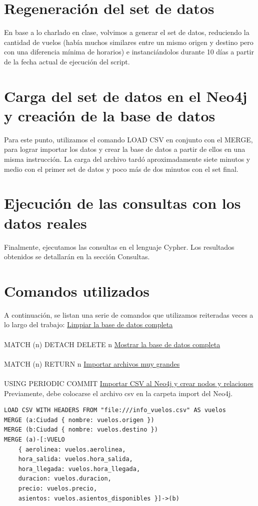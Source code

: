 \documentclass[a4paper,11pt]{article}
\begin{document}
\newpage
\section{Regeneración del set de datos}
En base a lo charlado en clase, volvimos a generar el set de datos, reduciendo la cantidad de vuelos (había muchos similares entre un mismo origen y destino pero con una diferencia mínima de horarios) e instanciándolos durante 10 días a partir de la fecha actual de ejecución del script.

\section{Carga del set de datos en el Neo4j y creación de la base de datos}
Para este punto, utilizamos el comando LOAD CSV en conjunto con el MERGE, para lograr importar los datos y crear la base de datos a partir de ellos en una misma instrucción.
La carga del archivo tardó aproximadamente siete minutos y medio con el primer set de datos y poco más de dos minutos con el set final.

\section{Ejecución de las consultas con los datos reales}
Finalmente, ejecutamos las consultas en el lenguaje Cypher. Los resultados obtenidos se detallarán en la sección Consultas.

\newpage
\section*{Comandos utilizados}
A continuación, se listan una serie de comandos que utilizamos reiteradas veces a lo largo del trabajo:
\bigbreak
\noindent
\underline{Limpiar la base de datos completa}\\
\noindent
\\
MATCH (n) DETACH DELETE n
\bigbreak
\noindent
\underline{Mostrar la base de datos completa}\\
\noindent
\\
MATCH (n) RETURN n
\bigbreak
\noindent
\underline{Importar archivos muy grandes}\\
\noindent
\\
USING PERIODIC COMMIT
\bigbreak
\noindent
\underline{Importar CSV al Neo4j y crear nodos y relaciones}\\

Previamente, debe colocarse el archivo csv en la carpeta import del Neo4j.
\begin{lstlisting}[style=neo4j]
LOAD CSV WITH HEADERS FROM "file:///info_vuelos.csv" AS vuelos
MERGE (a:Ciudad { nombre: vuelos.origen })
MERGE (b:Ciudad { nombre: vuelos.destino })
MERGE (a)-[:VUELO
	{ aerolinea: vuelos.aerolinea,
	hora_salida: vuelos.hora_salida,
	hora_llegada: vuelos.hora_llegada,
	duracion: vuelos.duracion,
	precio: vuelos.precio,
	asientos: vuelos.asientos_disponibles }]->(b)
\end{lstlisting}
\end{document}
